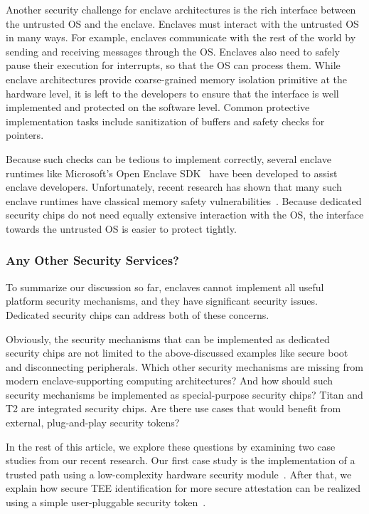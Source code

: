 Another security challenge for enclave architectures is the rich interface between the untrusted OS and the enclave. Enclaves must interact with the untrusted OS in many ways. For example, enclaves communicate with the rest of the world by sending and receiving messages through the OS. Enclaves also need to safely pause their execution for interrupts, so that the OS can process them. While enclave architectures provide coarse-grained memory isolation primitive at the hardware level, it is left to the developers to ensure that the interface is well implemented and protected on the software level. Common protective implementation tasks include sanitization of buffers and safety checks for pointers. 

Because such checks can be tedious to implement correctly, several enclave runtimes like Microsoft's Open Enclave SDK~\cite{open-enclave-sdk} have been developed to assist enclave developers. Unfortunately, recent research has shown that many such enclave runtimes have classical memory safety vulnerabilities~\cite{van2019tale}. Because dedicated security chips do not need equally extensive interaction with the OS, the interface towards the untrusted OS is easier to protect tightly. 


\subsubsection*{Any Other Security Services?}

To summarize our discussion so far, enclaves cannot implement all useful platform security mechanisms, and they have significant security issues. Dedicated security chips can address both of these concerns. 

Obviously, the security mechanisms that can be implemented as dedicated security chips are not limited to the above-discussed examples like secure boot and disconnecting peripherals. Which other security mechanisms are missing from modern enclave-supporting computing architectures? And how should such security mechanisms be implemented as special-purpose security chips? Titan and T2 are integrated security chips. Are there use cases that would benefit from external, plug-and-play security tokens?

In the rest of this article, we explore these questions by examining two case studies from our recent research. Our first case study is the implementation of a trusted path using a low-complexity hardware security module~\cite{protection}. After that, we explain how secure TEE identification for more secure attestation can be realized using a simple user-pluggable security token~\cite{proximitee}.
